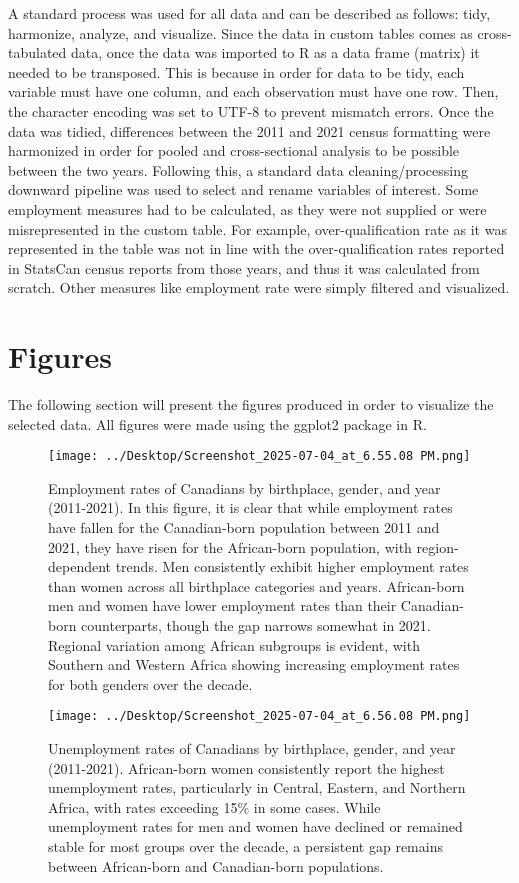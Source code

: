 \documentclass[12pt]{article}
\begin{document}
A standard process was used for all data and can be described as follows: tidy, harmonize, analyze, and visualize. Since the data in custom tables comes as cross-tabulated data, once the data was imported to R as a data frame (matrix) it needed to be transposed. This is because in order for data to be tidy, each variable must have one column, and each observation must have one row. Then, the character encoding was set to UTF-8 to prevent mismatch errors. Once the data was tidied, differences between the 2011 and 2021 census formatting were harmonized in order for pooled and cross-sectional analysis to be possible between the two years. Following this, a standard data cleaning/processing downward pipeline was used to select and rename variables of interest. Some employment measures had to be calculated, as they were not supplied or were misrepresented in the custom table. For example, over-qualification rate as it was represented in the table was not in line with the over-qualification rates reported in StatsCan census reports from those years, and thus it was calculated from scratch. Other measures like employment rate were simply filtered and visualized. 

\section*{Figures}
The following section will present the figures produced in order to visualize the selected data. All figures were made using the ggplot2 package in R.
\begin{figure}[h!]
    \centering
   \texttt{[image: ../Desktop/Screenshot\_2025-07-04\_at\_6.55.08 PM.png]}
    \caption{Employment rates of Canadians by birthplace, gender, and year (2011-2021). In this figure, it is clear that while employment rates have fallen for the Canadian-born population between 2011 and 2021, they have risen for the African-born population, with region-dependent trends. Men consistently exhibit higher employment rates than women across all birthplace categories and years. African-born men and women have lower employment rates than their Canadian-born counterparts, though the gap narrows somewhat in 2021. Regional variation among African subgroups is evident, with Southern and Western Africa showing increasing employment rates for both genders over the decade.}
\end{figure}


\begin{figure}[h!]
    \centering
    \texttt{[image: ../Desktop/Screenshot\_2025-07-04\_at\_6.56.08 PM.png]}
    \caption{Unemployment rates of Canadians by birthplace, gender, and year (2011-2021). African-born women consistently report the highest unemployment rates, particularly in Central, Eastern, and Northern Africa, with rates exceeding 15\% in some cases. While unemployment rates for men and women have declined or remained stable for most groups over the decade, a persistent gap remains between African-born and Canadian-born populations.}
\end{figure}
\end{document}
